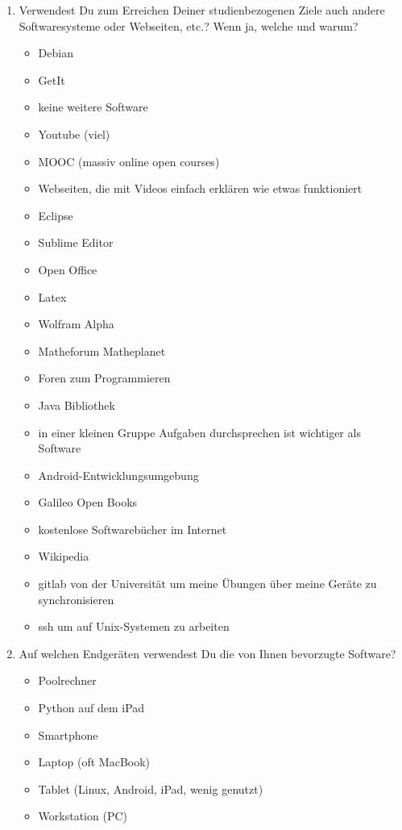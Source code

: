 \documentclass{article}
\begin{document}
\begin{enumerate}
\item Verwendest Du zum Erreichen Deiner studienbezogenen Ziele auch andere Softwaresysteme oder Webseiten, etc.? Wenn ja, welche und warum?
\begin{itemize}
\item Debian
\item GetIt
\item keine weitere Software
\item Youtube (viel)
\item MOOC (massiv online open courses)
\item Webseiten, die mit Videos einfach erklären wie etwas funktioniert
\item Eclipse
\item Sublime Editor
\item Open Office
\item Latex
\item Wolfram Alpha
\item Matheforum Matheplanet
\item Foren zum Programmieren
\item Java Bibliothek
\item in einer kleinen Gruppe Aufgaben durchsprechen ist wichtiger als Software
\item Android-Entwicklungsumgebung
\item Galileo Open Books
\item kostenlose Softwarebücher im Internet
\item Wikipedia
\item gitlab von der Universität um meine Übungen über meine Geräte zu synchronisieren
\item ssh um auf Unix-Systemen zu arbeiten
\end{itemize}

\item Auf welchen Endgeräten verwendest Du die von Ihnen bevorzugte Software?
\begin{itemize}
\item Poolrechner
\item Python auf dem iPad
\item Smartphone
\item Laptop (oft MacBook)
\item Tablet (Linux, Android, iPad, wenig genutzt)
\item Workstation (PC)
\end{itemize}


\end{enumerate}
\end{document}
